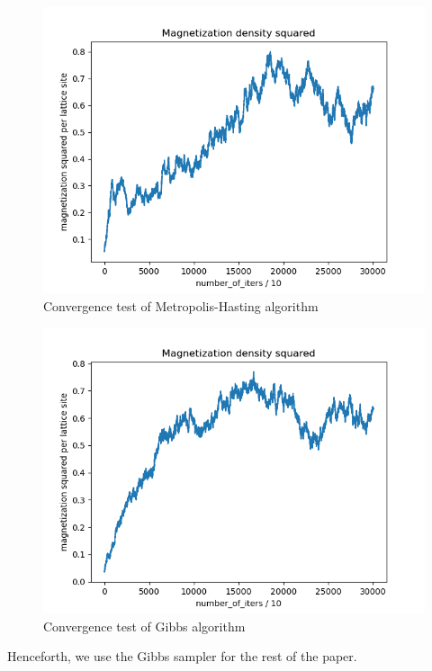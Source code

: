 \documentclass{article}
\begin{document}
    \begin{figure}[ht]
        \includegraphics[width=\columnwidth]{plots/mag_sq_density_mh.png}
        \caption{Convergence test of Metropolis-Hasting algorithm}
        \label{fig:3}
    \end{figure}

    \begin{figure}[ht]
        \includegraphics[width=\columnwidth]{plots/mag_sq_density_gibbs.png}
        \caption{Convergence test of Gibbs algorithm}
        \label{fig:3}
    \end{figure}
   
Henceforth, we use the Gibbs sampler for the rest of the paper.
\end{document}
